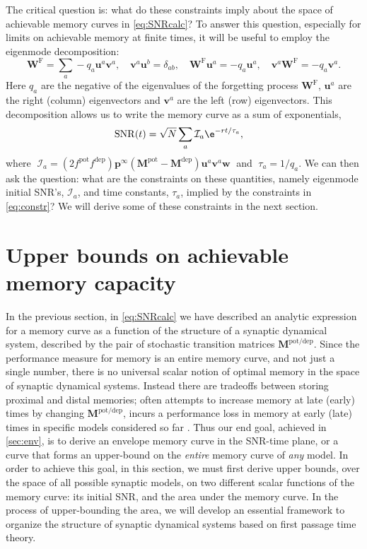 \documentclass{article} %
\DeclareMathOperator{\snr}{SNR}
\newcommand{\pr}{\mathbf{p}}
\newcommand{\eq}{\pr^\infty}
\newcommand{\w}{\mathbf{w}}
\newcommand{\W}{\mathbf{W}}
\newcommand{\M}{\mathbf{M}}
\newcommand{\frg}{\W^{\mathrm{F}}}
\newcommand{\pot}{^{\text{pot}}}
\newcommand{\dep}{^{\text{dep}}}
\newcommand{\potdep}{^{\text{pot/dep}}}
\newcommand{\uv}{\mathbf{u}}
\newcommand{\vv}{\mathbf{v}}
\newcommand{\CI}{\mathcal{I}}
\begin{document}
The critical question is: what do these constraints imply about the space of achievable memory curves in \eqref{eq:SNRcalc}?
To answer this question, especially for limits on achievable memory at finite times, it will be useful to employ the eigenmode decomposition:
%
\begin{equation}\label{eq:eigendecomp}
  \frg = \sum_a -q_a \uv^a \vv^a,
  \quad
  \vv^a \uv^b = \delta_{ab},
  \quad
  \frg \uv^a = -q_a \uv^a,
  \quad
  \vv^a \frg = -q_a \vv^a.
\end{equation}
%
Here $q_a$ are the negative of the eigenvalues of the forgetting process $\frg$, $\uv^a$ are the right (column) eigenvectors and $\vv^a$ are the left (row) eigenvectors.
This decomposition allows us to write the memory curve as a sum of exponentials,
%
\begin{equation}\label{eq:SNReigen}
\begin{aligned}
  \snr(t) &= \sqrt{N}\sum_a \CI_a \e^{-rt/\tau_a},
\end{aligned}
\end{equation}
%
where $\;\CI_a = (2 f\pot f\dep) \eq (\M\pot-\M\dep) \uv^a  \vv^a \w\;$ and $\;\tau_a = {1}/{q_a}$.
We can then ask the question: what are the constraints on these quantities, namely eigenmode initial SNR's, $\CI_a$, and time constants, $\tau_a$, implied by the constraints in \eqref{eq:constr}?
We will derive some of these constraints in the next section.

\section{Upper bounds on achievable memory capacity}\label{sec:bounds}

In the previous section, in \eqref{eq:SNRcalc} we have described an analytic expression for a memory curve as a function of the structure of a synaptic dynamical system, described by the pair of stochastic transition matrices  $\M\potdep$.
Since the performance measure for memory is an entire memory curve, and not just a single number, there is no universal scalar notion of optimal memory in the space of synaptic dynamical systems.
Instead there are tradeoffs between storing proximal and distal memories;  often attempts to increase memory at late (early) times by changing $\M\potdep$, incurs a performance loss in memory at early (late) times in specific models considered so far \cite{Fusi2005cascade,Fusi2007multistate,Leibold2008serial}.
Thus our end goal, achieved in \autoref{sec:env}, is to derive an envelope memory curve in the SNR-time plane, or a curve that forms an upper-bound on the {\it entire} memory curve of {\it any} model.
In order to achieve this goal, in this section, we must first derive upper bounds, over the space of all possible synaptic models, on two different scalar functions of the memory curve: its initial SNR, and the area under the memory curve.
In the process of upper-bounding the area, we will develop an essential framework to organize the structure of synaptic dynamical systems based on first passage time theory.
\end{document}
